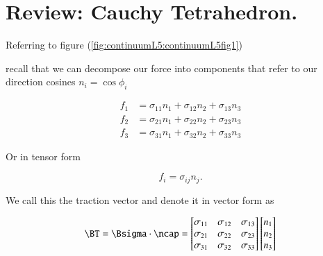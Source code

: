 \label{chap:continuumL5}

\beginArtWithToc

\section{Review: Cauchy Tetrahedron.}

Referring to figure (\ref{fig:continuumL5:continuumL5fig1})

recall that we can decompose our force into components that refer to our direction cosines $n_i = \cos\phi_i$

\begin{align}\label{eqn:continuumL5:10}
f_1 &= \sigma_{11} n_1 + \sigma_{12} n_2 + \sigma_{13} n_3 \\
f_2 &= \sigma_{21} n_1 + \sigma_{22} n_2 + \sigma_{23} n_3 \\
f_3 &= \sigma_{31} n_1 + \sigma_{32} n_2 + \sigma_{33} n_3
\end{align}

Or in tensor form

\begin{equation}\label{eqn:continuumL5:30}
f_i = \sigma_{ij} n_j.
\end{equation}

We call this the traction vector and denote it in vector form as

\begin{equation}\label{eqn:continuumL5:50}
\BT = \Bsigma \cdot \ncap
=
\begin{bmatrix}
\sigma_{11} & \sigma_{12} & \sigma_{13} \\
\sigma_{21} & \sigma_{22} & \sigma_{23} \\
\sigma_{31} & \sigma_{32} & \sigma_{33}
\end{bmatrix}
\begin{bmatrix}
n_1 \\
n_2 \\
n_3
\end{bmatrix}
\end{equation}

